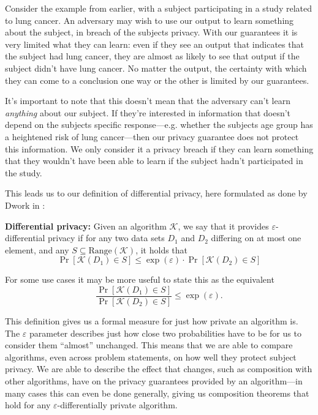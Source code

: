 \documentclass[12pt]{article}
\newcommand{\fancy}{\mathcal}
\renewcommand{\epsilon}{\varepsilon}
\begin{document}
Consider the example from earlier, with a subject participating in a study related to lung cancer. An adversary may wish to use our output to learn something about the subject, in breach of the subjects privacy. With our guarantees it is very limited what they can learn: even if they see an output that indicates that the subject had lung cancer, they are almost as likely to see that output if the subject didn't have lung cancer. No matter the output, the certainty with which they can come to a conclusion one way or the other is limited by our guarantees.

It's important to note that this doesn't mean that the adversary can't learn \emph{anything} about our subject. If they're interested in information that doesn't depend on the subjects specific response---e.g. whether the subjects age group has a heightened risk of lung cancer---then our privacy guarantee does not protect this information. We only consider it a privacy breach if they can learn something that they wouldn't have been able to learn if the subject hadn't participated in the study. \bigskip


This leads us to our definition of differential privacy, here formulated as done by Dwork in \cite{dwork2006_diffpriv}:

\begin{mdframed}
    \textbf{Differential privacy:} Given an algorithm $\fancy{K}$, we say that it provides $\epsilon$-differential privacy if for any two data sets $D_1$ and $D_2$ differing on at most one element, and any $S \subseteq \text{Range}(\fancy{K})$, it holds that
    \begin{equation}\label{eq:diffpriv}
        \Pr[\fancy{K}(D_1) \in S] \leq \exp(\epsilon) \cdot \Pr[\fancy{K}(D_2) \in S]
    \end{equation}
\end{mdframed}

For some use cases it may be more useful to state this as the equivalent
\begin{equation*}
    \frac{\Pr[\fancy{K}(D_1) \in S]}{\Pr[\fancy{K}(D_2) \in S]} \leq \exp(\epsilon).
\end{equation*}\bigskip

This definition gives us a formal measure for just how private an algorithm is. The $\epsilon$ parameter describes just how close two probabilities have to be for us to consider them ``almost'' unchanged. This means that we are able to compare algorithms, even across problem statements, on how well they protect subject privacy. We are able to describe the effect that changes, such as composition with other algorithms, have on the privacy guarantees provided by an algorithm---in many cases this can even be done generally, giving us composition theorems that hold for any $\epsilon$-differentially private algorithm.
\end{document}
